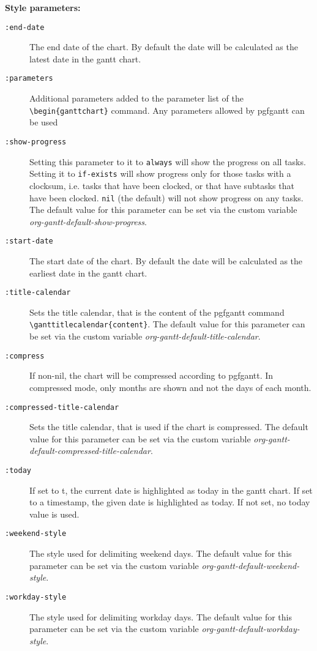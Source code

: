 \documentclass[11pt]{article}
\begin{document}
\noindent
\textbf{Style parameters:}
\begin{description}
\item[{\texttt{:end-date}}] The end date of the chart. By default the date will be calculated as the latest date in the gantt chart.
\item[{\texttt{:parameters}}] Additional parameters added to the parameter list of the \texttt{\textbackslash{}begin\{ganttchart\}} command. Any parameters allowed by pgfgantt can be used
\item[{\texttt{:show-progress}}] Setting this parameter to it to \texttt{always} will show the progress on all tasks. Setting it to \texttt{if-exists} will show progress only for those tasks with a clocksum, i.e. tasks that have been clocked, or that have subtasks that have been clocked. \texttt{nil} (the default) will not show progress on any tasks. The default value for this parameter can be set via the custom variable \emph{org-gantt-default-show-progress}.
\item[{\texttt{:start-date}}] The start date of the chart. By default the date will be calculated as the earliest date in the gantt chart.
\item[{\texttt{:title-calendar}}] Sets the title calendar, that is the content of the pgfgantt command \texttt{\textbackslash{}ganttitlecalendar\{content\}}. The default value for this parameter can be set via the custom variable \emph{org-gantt-default-title-calendar}.
\item[{\texttt{:compress}}] If non-nil, the chart will be compressed according to pgfgantt. In compressed mode, only months are shown and not the days of each month.
\item[{\texttt{:compressed-title-calendar}}] Sets the title calendar, that is used if the chart is compressed. The default value for this parameter can be set via the custom variable \emph{org-gantt-default-compressed-title-calendar}.
\item[{\texttt{:today}}] If set to t, the current date is highlighted as today in the gantt chart. If set to a timestamp, the given date is highlighted as today. If not set, no today value is used.
\item[{\texttt{:weekend-style}}] The style used for delimiting weekend days. The default value for this parameter can be set via the custom variable \emph{org-gantt-default-weekend-style}.
\item[{\texttt{:workday-style}}] The style used for delimiting workday days. The default value for this parameter can be set via the custom variable \emph{org-gantt-default-workday-style}.

\end{description}
\end{document}
